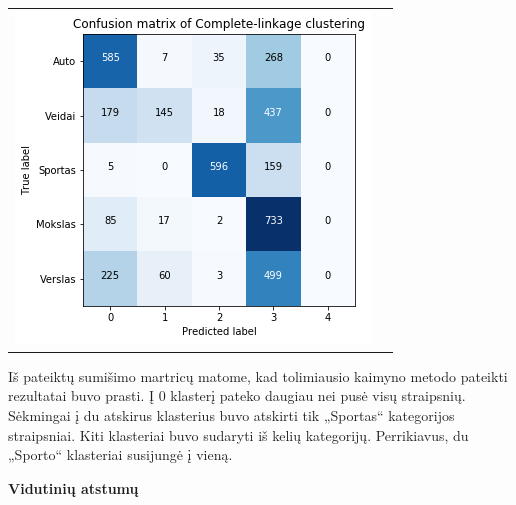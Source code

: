 \documentclass{VUMIFInfKursinis}
\begin{document}
\begin{table}[!h]
\begin{tabular}{ll}
\begin{minipage}[t]{0.47\columnwidth}
			\includegraphics[width=\columnwidth]{./Pictures/10000201000001650000014D320329FEFC52B260.png}\strut
			\center{b)}
		\end{minipage}
	\end{tabular}
\end{table}

Iš pateiktų sumišimo martricų matome, kad tolimiausio kaimyno metodo
pateikti rezultatai buvo prasti. Į 0 klasterį pateko daugiau nei pusė
visų straipsnių. Sėkmingai į du atskirus klasterius buvo atskirti tik
„Sportas“ kategorijos straipsniai. Kiti klasteriai buvo sudaryti iš
kelių kategorijų. Perrikiavus, du „Sporto“ klasteriai susijungė į
vieną.

\textbf{Vidutinių atstumų}
\end{document}
